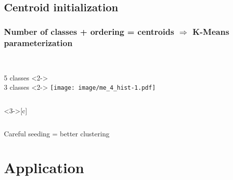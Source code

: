 	\subsection[Centroid]{Centroid initialization}
		\begin{frame}
		\frametitle{Number of classes + ordering = centroids $\Rightarrow$ K-Means parameterization}
		\begin{columns}[c]	
			\column{6em}			
				\\
				\hfill 5 classes \hfill \vspace{1em}
			\column{3.6em}<2->
				\\
				3 classes
			\column{12em}<2->
				\texttt{[image: image/me\_4\_hist-1.pdf]}
		\end{columns}

		\begin{columns}<3->[c]	
			\column{10em}
			\column{10em}
			\column{10em}
		\end{columns}	
		\pause\pause
		\begin{center}
			\alert{Careful seeding = better clustering}
		\end{center}
		\end{frame}
		

\section{Application}
